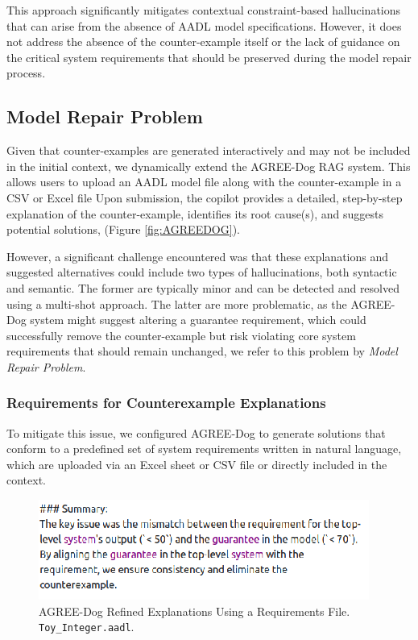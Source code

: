 This approach significantly mitigates contextual constraint-based hallucinations that can arise from the absence of AADL model specifications. However, it does not address the absence of the counter-example itself or the lack of guidance on the critical system requirements that should be preserved during the model repair process.
 

\subsection{Model Repair Problem}

Given that counter-examples are generated interactively and may not be included in the initial context, we dynamically extend the AGREE-Dog RAG system. This allows users to upload an AADL model file along with the counter-example in a CSV or Excel file %
Upon submission, the copilot provides a detailed, step-by-step explanation of the counter-example, identifies its root cause(s), and suggests potential solutions, (Figure \ref{fig:AGREEDOG}). 


However, a significant challenge encountered was that these explanations and suggested alternatives could include two types of hallucinations, both syntactic and semantic. The former are typically minor and can be detected and resolved using a multi-shot approach. The latter are more problematic, as the AGREE-Dog system might suggest altering a guarantee requirement, which could successfully remove the counter-example but risk violating core system requirements that should remain unchanged, we refer to this problem by \textit{Model Repair Problem}. 


\subsubsection{Requirements for Counterexample Explanations}

To mitigate this issue, we configured AGREE-Dog to generate solutions that conform to a predefined set of system requirements written in natural language, which are uploaded via an Excel sheet or CSV file or directly included in the context. 

\begin{figure}[t]  
    \centering
    \includegraphics[width=0.95\columnwidth]{REQ-AWARE-REF.png}  %
    \caption{AGREE-Dog Refined Explanations Using a Requirements File. \texttt{Toy\_Integer.aadl}.}
    \label{fig:REQ-AWARE-EXPL}
\end{figure}


